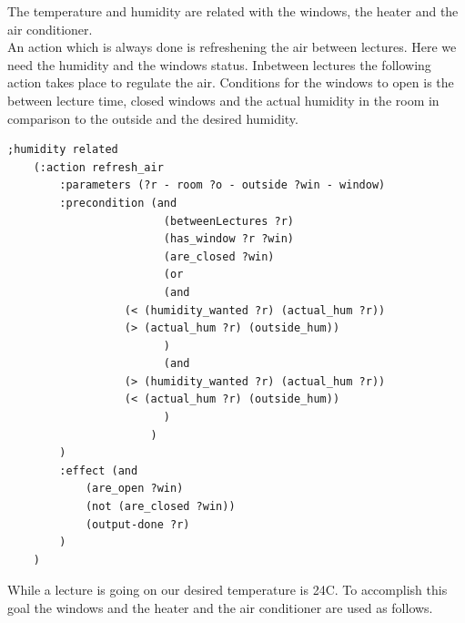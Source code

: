 \documentclass[runningheads]{llncs}
\begin{document}
The temperature and humidity are related with the windows, the heater and the air conditioner. \\
An action which is always done is refreshening the air between lectures. Here we need the humidity and the windows status. Inbetween lectures the following action takes place to regulate the air.
Conditions for the windows to open is the between lecture time, closed windows and the actual humidity in the room in comparison to the outside and the desired humidity. 
\begin{lstlisting}
;humidity related
    (:action refresh_air
        :parameters (?r - room ?o - outside ?win - window)
        :precondition (and
                        (betweenLectures ?r)
                        (has_window ?r ?win)
                        (are_closed ?win)
                        (or 
                        (and
                  (< (humidity_wanted ?r) (actual_hum ?r))
                  (> (actual_hum ?r) (outside_hum))
                        )
                        (and
                  (> (humidity_wanted ?r) (actual_hum ?r))
                  (< (actual_hum ?r) (outside_hum))
                        )
                      )
        )
        :effect (and
            (are_open ?win)
            (not (are_closed ?win))
            (output-done ?r)
        )
    )
\end{lstlisting}

While a lecture is going on our desired temperature is 24C. To accomplish this goal the windows and the heater and the air conditioner are used as follows.
\end{document}
